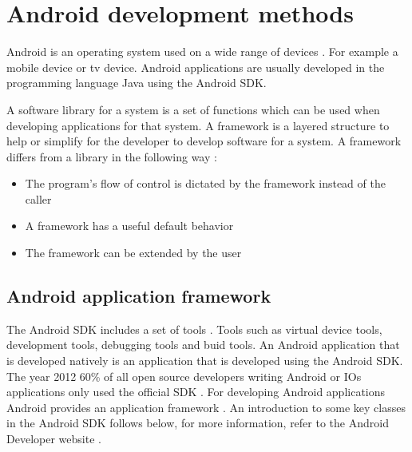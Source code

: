 \section{Android development methods}\label{sec:android-development-methods}
Android is an operating system used on a wide range of devices \cite{dell2011}. For example a mobile device or tv device. Android applications are usually developed in the programming language Java using the Android SDK.

A software library for a system is a set of functions which can be used when developing applications for that system. A framework is a layered structure to help or simplify for the developer to develop software for a system. A framework differs from a library in the following way \cite{riehle2000}:

\begin{itemize}
\item The program's flow of control is dictated by the framework instead of the caller
\item A framework has a useful default behavior
\item The framework can be extended by the user
\end{itemize}

\subsection{Android application framework} \label{subsec:android-application-framework}
The Android SDK includes a set of tools \cite{sdk2015}. Tools such as virtual device tools, development tools, debugging tools and buid tools. An Android application that is developed natively is an application that is developed using the Android SDK. The year 2012 60\% of all open source developers writing Android or IOs applications only used the official SDK \cite{eclipse2012}. For developing Android applications Android provides an application framework \cite{android-framework2015}. An introduction to some key classes in the Android SDK follows below, for more information, refer to the Android Developer website \cite{androiddevelopers2015}.

